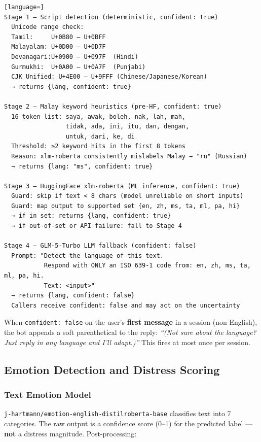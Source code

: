 \documentclass[12pt,a4paper]{article}
\begin{document}
\begin{lstlisting}[language=]
Stage 1 — Script detection (deterministic, confident: true)
  Unicode range check:
  Tamil:     U+0B80 – U+0BFF
  Malayalam: U+0D00 – U+0D7F
  Devanagari:U+0900 – U+097F  (Hindi)
  Gurmukhi:  U+0A00 – U+0A7F  (Punjabi)
  CJK Unified: U+4E00 – U+9FFF (Chinese/Japanese/Korean)
  → returns {lang, confident: true}

Stage 2 — Malay keyword heuristics (pre-HF, confident: true)
  16-token list: saya, awak, boleh, nak, lah, mah,
                 tidak, ada, ini, itu, dan, dengan,
                 untuk, dari, ke, di
  Threshold: ≥2 keyword hits in the first 8 tokens
  Reason: xlm-roberta consistently mislabels Malay → "ru" (Russian)
  → returns {lang: "ms", confident: true}

Stage 3 — HuggingFace xlm-roberta (ML inference, confident: true)
  Guard: skip if text < 8 chars (model unreliable on short inputs)
  Guard: map output to supported set {en, zh, ms, ta, ml, pa, hi}
  → if in set: returns {lang, confident: true}
  → if out-of-set or API failure: fall to Stage 4

Stage 4 — GLM-5-Turbo LLM fallback (confident: false)
  Prompt: "Detect the language of this text.
           Respond with ONLY an ISO 639-1 code from: en, zh, ms, ta, ml, pa, hi.
           Text: <input>"
  → returns {lang, confident: false}
  Callers receive confident: false and may act on the uncertainty
\end{lstlisting}

When \texttt{confident: false} on the user's \textbf{first message} in a session
(non-English), the bot appends a soft parenthetical to the reply:
\textit{``(Not sure about the language? Just reply in any language and I'll adapt.)''}
This fires at most once per session.

\subsection{Emotion Detection and Distress Scoring}

\subsubsection{Text Emotion Model}

\texttt{j-hartmann/emotion-english-distilroberta-base} classifies text into 7 categories.
The raw output is a confidence score (0–1) for the predicted label — \textbf{not} a
distress magnitude. Post-processing:
\end{document}
